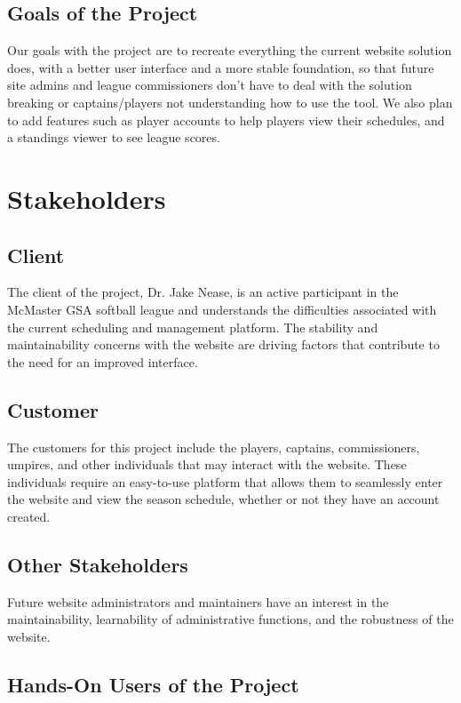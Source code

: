 \documentclass[12pt]{article}
\begin{document}
\subsection{Goals of the Project}
Our goals with the project are to recreate everything the current website
solution does, with a better user interface and a more stable foundation, so
that future site admins and league commissioners don't have to deal with the
solution breaking or captains/players not understanding how to use the tool.
We also plan to add features such as player accounts to help players view
their schedules, and a standings viewer to see league scores.

\section{Stakeholders}
\subsection{Client}

The client of the project, Dr. Jake Nease, is an active participant in the
McMaster GSA softball league and understands the difficulties associated with
the current scheduling and management platform. The stability and maintainability
concerns with the website are driving factors that contribute to the need for
an improved interface.

\subsection{Customer}

The customers for this project include the players, captains, commissioners,
umpires, and other individuals that may interact with the website. These
individuals require an easy-to-use platform that allows them to seamlessly
enter the website and view the season schedule, whether or not they have an
account created. 

\subsection{Other Stakeholders}

Future website administrators and maintainers have an interest in the
maintainability, learnability of administrative functions, and the robustness
of the website.

\subsection{Hands-On Users of the Project}
\end{document}

